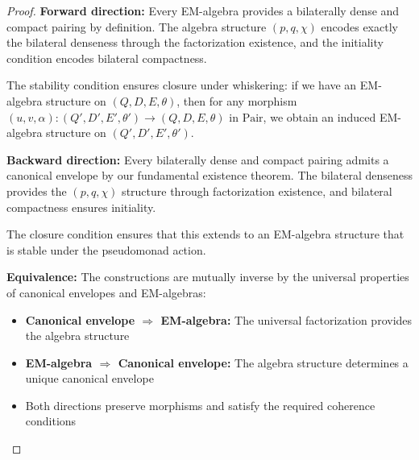 \documentclass[11pt]{article}
\theoremstyle{plain}
\theoremstyle{definition}
\theoremstyle{remark}
\newcommand{\Pair}{\mathrm{Pair}}
\begin{document}
\begin{proof}
\textbf{Forward direction:} Every EM-algebra provides a bilaterally dense and compact pairing by definition. The algebra structure $(p, q, \chi)$ encodes exactly the bilateral denseness through the factorization existence, and the initiality condition encodes bilateral compactness.

The stability condition ensures closure under whiskering: if we have an EM-algebra structure on $(Q, D, E, \theta)$, then for any morphism $(u, v, \alpha) : (Q', D', E', \theta') \to (Q, D, E, \theta)$ in $\Pair$, we obtain an induced EM-algebra structure on $(Q', D', E', \theta')$.

\textbf{Backward direction:} Every bilaterally dense and compact pairing admits a canonical envelope by our fundamental existence theorem. The bilateral denseness provides the $(p, q, \chi)$ structure through factorization existence, and bilateral compactness ensures initiality.

The closure condition ensures that this extends to an EM-algebra structure that is stable under the pseudomonad action.

\textbf{Equivalence:} The constructions are mutually inverse by the universal properties of canonical envelopes and EM-algebras:
\begin{itemize}
\item \textbf{Canonical envelope $\Rightarrow$ EM-algebra:} The universal factorization provides the algebra structure
\item \textbf{EM-algebra $\Rightarrow$ Canonical envelope:} The algebra structure determines a unique canonical envelope
\item Both directions preserve morphisms and satisfy the required coherence conditions
\end{itemize}
\end{proof}
\end{document}
